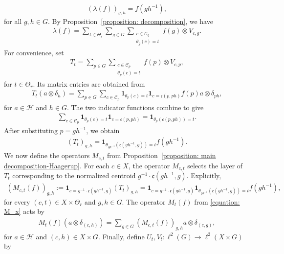 \documentclass[12pt,reqno]{amsart}
\newcommand{\Hil}{\mathcal{H}}
\numberwithin{equation}{section}
\begin{document}
\begin{align*}
     (\lambda(f))_{g,h}=f(gh^{-1}),
\end{align*}
for all $g,h\in G$. 
By Proposition~\ref{proposition: decomposition}, we have
\begin{align*}
    \lambda(f)=\sum_{t\in \Theta_r}\sum_{g\in G}\sum_{\substack{c\in \mathcal{C}_g\\ \theta_g(c)=t}} f(g)\otimes V_{c,g}.
\end{align*}
For convenience, set
\begin{align*}
    T_t=\sum_{p\in G}\sum_{\substack{c\in \mathcal{C}_p\\ \theta_p(c)=t}} f(p)\otimes V_{c,p},
\end{align*}
for $t\in\Theta_r$. Its matrix entries are obtained from
\begin{align*}
    T_t(a \otimes \delta_h)=\sum_{p\in G}\sum_{c\in \mathcal{C}_p}\mathbf{1}_{\theta_p(c)=t}\mathbf{1}_{c=\mathfrak{c}(p,ph)} f(p)a\otimes \delta_{ph},
\end{align*}
for $a\in \Hil$ and $h\in G$.
The two indicator functions combine to give 
\begin{align*}
    \sum_{c\in \mathcal{C}_p}\mathbf{1}_{\theta_p(c)=t}\mathbf{1}_{c=\mathfrak{c}(p,ph)}=\mathbf{1}_{\theta_p(\mathfrak{c}(p,ph))=t}.
\end{align*}
After substituting $p=gh^{-1}$, we obtain
\begin{align*}
    (T_t)_{g,h}=\mathbf{1}_{\theta_{gh^{-1}}(\mathfrak{c}(gh^{-1},g))=t} f(gh^{-1}).
\end{align*}
We now define the operators $M_{c,t}$ from Proposition~\ref{proposition: main decomposition-Haagerup}. For each $c\in X$, the operator $M_{c,t}$ selects the layer of $T_t$ corresponding to the normalized centroid $g^{-1}\cdot\mathfrak{c}(gh^{-1},g)$. Explicitly, 
\begin{align}\label{equation: operators M_c,x}
    (M_{c,t}(f))_{g,h}:=\mathbf{1}_{c=g^{-1}\cdot\mathfrak{c}(gh^{-1},g)} (T_t)_{g,h}=\mathbf{1}_{c=g^{-1}\cdot\mathfrak{c}(gh^{-1},g)}\mathbf{1}_{\theta_{gh^{-1}}(\mathfrak{c}(gh^{-1},g))=t} f(gh^{-1}),
\end{align}
for every $(c,t)\in X\times \Theta_r$ and $g,h\in G$. The operator $M_t(f)$ from \eqref{equation: M_x} acts by
\begin{align}\label{equation: action of M_x}
    M_t(f) (a\otimes \delta_{(c,h)})=\sum_{g\in G} (M_{c,t}(f))_{g,h}a \otimes \delta_{(c,g)},
\end{align}
for $a\in\Hil$ and $(c,h)\in X\times G$. Finally, define $U_t,V_t:\ell^2(G)\to\ell^2(X\times G)$ by
\end{document}
